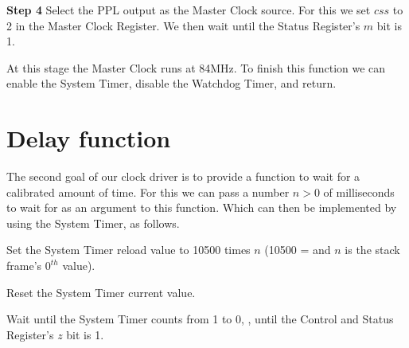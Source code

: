 \begin{paracol}{2}

{\sffamily\bfseries Step 4} Select the PPL output as the Master Clock source.
For this we set $css$ to 2 in the Master Clock Register. We then wait until the
Status Register's $m$ bit is 1.


At this stage the Master Clock runs at 84MHz. To finish this function we can
enable the System Timer, disable the Watchdog Timer, and return.

\end{paracol}

\section{Delay function}\label{section:delay-function}

The second goal of our clock driver is to provide a function to wait for a
calibrated amount of time. For this we can pass a number $n > 0$ of
milliseconds to wait for as an argument to this function. Which can then be
implemented by using the System Timer, as follows.\bigskip

\begin{paracol}{2}

Set the System Timer reload value to 10500 times $n$ (10500 =  and
$n$ is the stack frame's $0^{th}$ value).


Reset the System Timer current value.


Wait until the System Timer counts from 1 to 0, \ie, until the Control and
Status Register's $z$ bit is 1.

\end{paracol}

